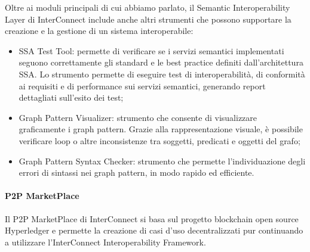Oltre ai moduli principali di cui abbiamo parlato, il Semantic Interoperability Layer di InterConnect include anche altri strumenti che possono supportare la creazione e la gestione di un sistema interoperabile:
\begin{itemize}
    \item SSA Test Tool: permette di verificare se i servizi semantici implementati seguono correttamente gli standard e le best practice definiti dall'architettura SSA. Lo strumento permette di eseguire test di interoperabilità, di conformità ai requisiti e di performance sui servizi semantici, generando report dettagliati sull'esito dei test;
    \item Graph Pattern Visualizer: strumento che consente di visualizzare graficamente i graph pattern. Grazie alla rappresentazione visuale, è possibile verificare loop o altre inconsistenze tra soggetti, predicati e oggetti del grafo;
    \item Graph Pattern Syntax Checker: strumento che permette l'individuazione degli errori di sintassi nei graph pattern, in modo rapido ed efficiente.
\end{itemize}



\paragraph{P2P MarketPlace}
Il P2P MarketPlace di InterConnect si basa sul progetto blockchain open source Hyperledger e permette la creazione di casi d'uso decentralizzati pur continuando a utilizzare l'InterConnect Interoperability Framework.
